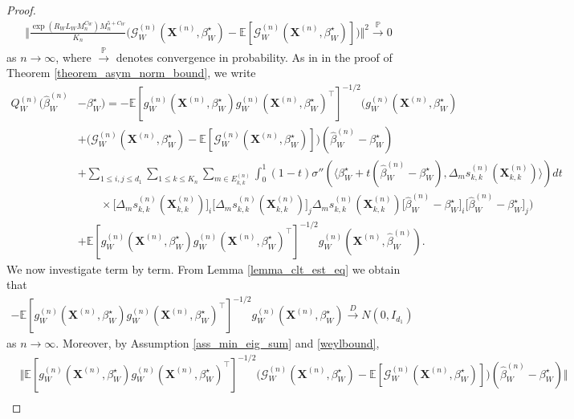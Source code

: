 \documentclass[10pt,a4paper]{amsart}
\begin{document}
\begin{proof}
\begin{align} \label{conv_prob_proof_asymp_norm_conv}
    \bigg\Vert \frac{\exp(R_WL_WM_n^{C_W}) M_n^{5+C_W}}{K_n} \big( \mathcal{G}_W^{(n)}(\mathbf{X}^{(n)},\beta_W^{\star}) - \mathbb{E}[\mathcal{G}_W^{(n)}(\mathbf{X}^{(n)},\beta_W^{\star})] \big) \bigg\Vert^2 \xrightarrow{\mathbb{P}} 0
\end{align}
as $n \rightarrow \infty$, where $\xrightarrow{\mathbb{P}}$ denotes convergence in probability. As in in the proof of Theorem \ref{theorem_asym_norm_bound}, we write 
\begin{align*}
     Q_W^{(n)} \big( \hat{\beta}_W^{(n)}&-\beta_W^{\star}\big) = -\mathbb{E}[g_W^{(n)}(\mathbf{X}^{(n)},\beta_W^{\star})g_W^{(n)}(\mathbf{X}^{(n)},\beta_W^{\star})^{\top}]^{-1/2} \bigg( g_W^{(n)}(\mathbf{X}^{(n)},\beta_W^{\star}) \\
    &+ \big(\mathcal{G}_W^{(n)}(\mathbf{X}^{(n)},\beta_W^{\star}) - \mathbb{E}[\mathcal{G}_W^{(n)}(\mathbf{X}^{(n)},\beta_W^{\star})]  \big)(\hat{\beta}_W^{(n)} - \beta_W^{\star}) \\
    & +\sum_{1 \leq i,j \leq d_1} \sum_{1\leq k \leq K_n} \sum_{m \in E_{k,k}^{(n)}} \int_0^1 (1-t) \sigma'' ( \langle \beta_W^{\star} + t(\hat{\beta}_W^{(n)} - \beta_W^{\star}) , \Delta_m s_{k,k}^{(n)}(\mathbf{X}_{k,k}^{(n)}) \rangle )dt  \\
    & \qquad \times \big[\Delta_m s_{k,k}^{(n)}(\mathbf{X}_{k,k}^{(n)}) \big]_i \big[\Delta_m s_{k,k}^{(n)}(\mathbf{X}_{k,k}^{(n)}) \big]_j \Delta_m s_{k,k}^{(n)}(\mathbf{X}_{k,k}^{(n)})  \big[ \hat{\beta}_W^{(n)}-\beta_W^{\star}\big]_i \big[ \hat{\beta}_W^{(n)}-\beta_W^{\star}\big]_j \bigg) \\
     & +\mathbb{E}[g_W^{(n)}(\mathbf{X}^{(n)},\beta_W^{\star})g_W^{(n)}(\mathbf{X}^{(n)},\beta_W^{\star})^{\top}]^{-1/2} g_W^{(n)}(\mathbf{X}^{(n)},\hat{\beta}_W^{(n)}).
\end{align*}
We now investigate term by term. From Lemma \ref{lemma_clt_est_eq} we obtain that
\begin{align*}
    -\mathbb{E}[g_W^{(n)}(\mathbf{X}^{(n)},\beta_W^{\star})g_W^{(n)}(\mathbf{X}^{(n)},\beta_W^{\star})^{\top}]^{-1/2}  g_W^{(n)}(\mathbf{X}^{(n)},\beta_W^{\star})  \xrightarrow{D} N(0,I_{d_1})
\end{align*}
as $n \rightarrow \infty$. Moreover, by Assumption \ref{ass_min_eig_sum} and \eqref{weylbound},
\begin{align*}
    & \big \Vert \mathbb{E}[g_W^{(n)}(\mathbf{X}^{(n)},\beta_W^{\star})g_W^{(n)}(\mathbf{X}^{(n)},\beta_W^{\star})^{\top}]^{-1/2} \big(\mathcal{G}_W^{(n)}(\mathbf{X}^{(n)},\beta_W^{\star}) - \mathbb{E}[\mathcal{G}_W^{(n)}(\mathbf{X}^{(n)},\beta_W^{\star})]  \big)(\hat{\beta}_W^{(n)} - \beta_W^{\star}) \big\Vert \\

\end{align*}
\end{proof}
\end{document}
